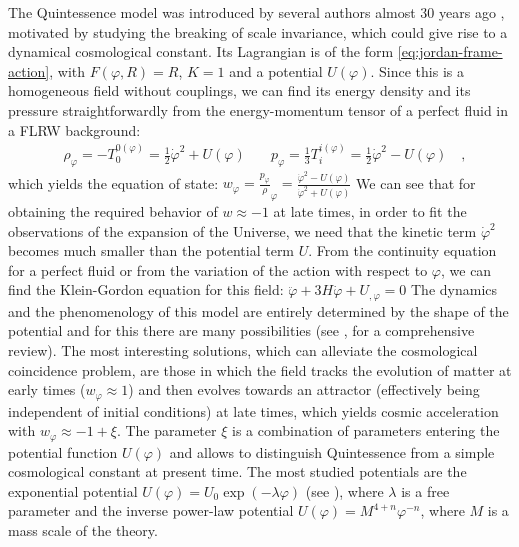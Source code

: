 The Quintessence model
was introduced by several authors almost 30 years
ago \cite{ratra_cosmological_1988, wetterich_cosmology_1988},
motivated by studying the 
breaking of scale invariance, which could give rise to a dynamical cosmological constant.
Its Lagrangian is of the form \cref{eq:jordan-frame-action}, with
$F(\varphi, R) = R$, $K = 1$ and a potential $U(\varphi)$.
Since this is a homogeneous field without couplings, we can find its energy density and its pressure 
straightforwardly from the energy-momentum tensor of a perfect fluid in a FLRW background:
\begin{align}\label{eq:quintessence-rho-p}
&\rho_{\varphi} = -T^{0 (\varphi)}_0 = \frac{1}{2}\dot\varphi^2 + U(\varphi) \quad 
&p_{\varphi} = \frac{1}{3} T^{i (\varphi)}_i = \frac{1}{2}\dot\varphi^2 - U(\varphi) \quad ,
\end{align}
which yields the equation of state:
\beeqp$
w_\varphi  = \frac{p_{\varphi}}\rho_{\varphi} = \frac{\dot\varphi^2 - U(\varphi)}{\dot\varphi^2 + U(\varphi)}
$
We can see that for obtaining the required behavior of $w\approx -1$ at late times, in order to fit 
the observations of the expansion of the Universe, we need that the kinetic term $\dot\varphi^2$
becomes much smaller than the potential term $U$.
From the continuity equation for a perfect fluid or from the variation of the action with respect to $\varphi$,
we can find the Klein-Gordon equation for this field:
\beeqp$
\label{eq:Klein-Gordon-Quintessence}
\ddot \varphi + 3 H \dot \varphi + U_{,\varphi} = 0
$
The dynamics and the phenomenology of this model are entirely determined by the shape of the potential
and for this there are many possibilities (see \cite[chap. 7]{amendola_dark_2010}, for a comprehensive review).
The most interesting solutions, which can alleviate the cosmological coincidence problem, are those in which the field
tracks the evolution of matter at early times ($w_\varphi \approx 1$) and then 
evolves towards an attractor (effectively being independent of initial conditions) 
at late times, which yields cosmic acceleration with $w_\varphi \approx -1+\xi$.
The parameter $\xi$ is a combination of parameters entering the potential function $U(\varphi)$ and allows
to distinguish Quintessence from a simple cosmological constant at present time.
The most studied potentials are the exponential potential $U(\varphi) = U_0\exp(-\lambda \varphi)$ 
(see \cite{copeland_exponential_1998}), where $\lambda$ is a free parameter
and the inverse power-law potential $U(\varphi) = M^{4+n} \varphi^{-n}$,
where $M$ is a mass scale of the theory.

